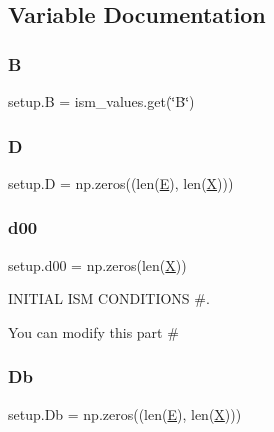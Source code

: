\subsection{Variable Documentation}
\mbox{\label{namespacesetup_a42412341b3814520bda92b5c86b66e3a}} 
\subsubsection{\texorpdfstring{B}{B}}
{\footnotesize\ttfamily setup.\+B = ism\+\_\+values.\+get(\char`\"{}B\char`\"{})}

\mbox{\label{namespacesetup_a7d38abc02bda738da0090e87d4dbfb32}} 
\subsubsection{\texorpdfstring{D}{D}}
{\footnotesize\ttfamily setup.\+D = np.\+zeros((len(\hyperlink{namespacesetup_a8bf3113e27e2925ec3309507c6d5ebf2}{E}), len(\hyperlink{namespacesetup_a0d71901ea06bb31a1b5e9e742158486f}{X})))}

\mbox{\label{namespacesetup_a63a67bebd13d1481694c3797aecd9b9e}} 
\subsubsection{\texorpdfstring{d00}{d00}}
{\footnotesize\ttfamily setup.\+d00 = np.\+zeros(len(\hyperlink{namespacesetup_a0d71901ea06bb31a1b5e9e742158486f}{X}))}



I\+N\+I\+T\+I\+AL I\+SM C\+O\+N\+D\+I\+T\+I\+O\+NS \#. 

You can modify this part \# \mbox{\label{namespacesetup_a02e78a8868e7e8dc00a649531a4e4d35}} 
\subsubsection{\texorpdfstring{Db}{Db}}
{\footnotesize\ttfamily setup.\+Db = np.\+zeros((len(\hyperlink{namespacesetup_a8bf3113e27e2925ec3309507c6d5ebf2}{E}), len(\hyperlink{namespacesetup_a0d71901ea06bb31a1b5e9e742158486f}{X})))}

